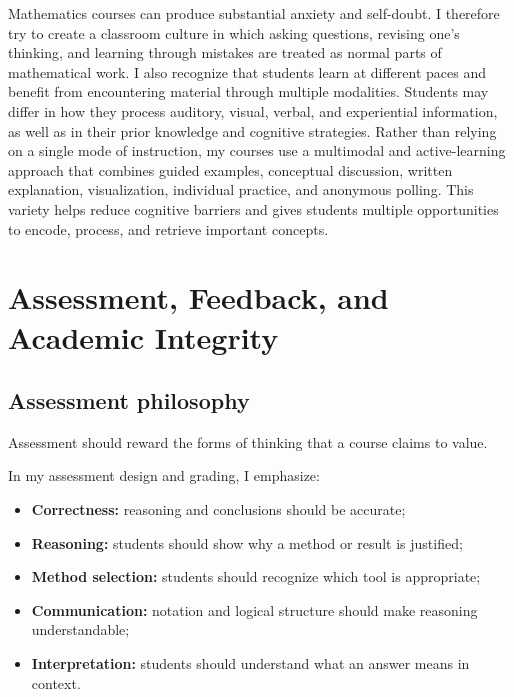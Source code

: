 \documentclass[11pt]{article}
\begin{document}
Mathematics courses can produce substantial anxiety and
self-doubt. I therefore try to create a classroom culture in which asking
questions,
revising one's thinking,
and learning through mistakes are treated as normal parts of
mathematical work.
I also recognize that students learn at different paces and benefit from encountering material through multiple modalities. Students may differ in how  they process auditory, visual, verbal, and experiential information, as well as in their prior knowledge and cognitive strategies. Rather than relying on a single mode of instruction, my courses  use a multimodal and active-learning approach that combines guided examples, conceptual discussion, written explanation, visualization, individual practice, and anonymous polling. This variety helps reduce cognitive barriers and gives students multiple opportunities to encode, process, and retrieve important concepts.



\section{Assessment, Feedback, and Academic Integrity}

\subsection{Assessment philosophy}

Assessment should reward the forms of  thinking
that a course claims to value.

In my assessment design and grading,
I emphasize:

\begin{itemize}

    \item \textbf{Correctness:}
     reasoning and conclusions should be
    accurate;

    \item \textbf{Reasoning:}
    students should show why a method or result is justified;

    \item \textbf{Method selection:}
    students should recognize which  tool is
    appropriate;

    \item \textbf{Communication:}
    notation and logical structure should make reasoning
    understandable;

    \item \textbf{Interpretation:}
    students should understand what an  answer
    means in context.

\end{itemize}
\end{document}
